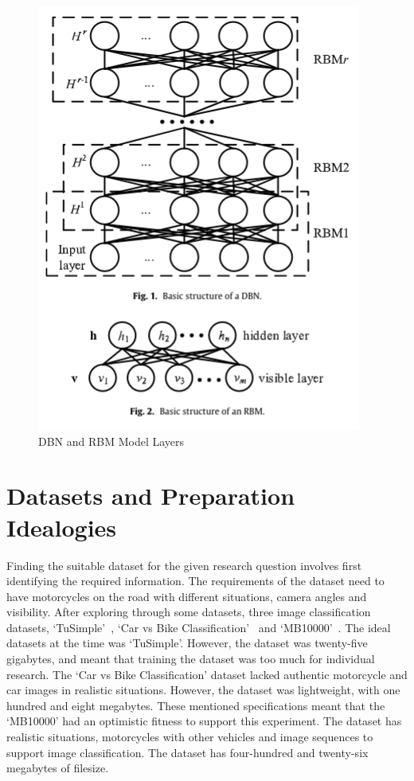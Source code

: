 \documentclass[12pt]{report} %
\begin{document}
		\begin{figure}[htp]
			\centering
			\includegraphics[width=\columnwidth]{Figures/literature_review/proposal/DBNRBMLayers.png}
			\caption{DBN and RBM Model Layers~\cite{zhao_parallel_2019}}
			\label{fig:dbnRBMLayers}
		\end{figure}

	\section{Datasets and Preparation Idealogies}
		Finding the suitable dataset for the given research question involves first identifying the required information. The requirements of the dataset need to have motorcycles on the road with different situations, camera angles and visibility. After exploring through some datasets, three image classification datasets, `TuSimple'~\cite{jeong_end--end_2017}, `Car vs Bike Classification'~\cite{deepnets_car_nodate} and `MB10000'~\cite{espinosa_motorcycle_2018}. The ideal datasets at the time was `TuSimple'. However, the dataset was twenty-five gigabytes, and meant that training the dataset was too much for individual research. The `Car vs Bike Classification' dataset lacked authentic motorcycle and car images in realistic situations. However, the dataset was lightweight, with one hundred and eight megabytes. These mentioned specifications meant that the `MB10000' had an optimistic fitness to support this experiment. The dataset has realistic situations, motorcycles with other vehicles and image sequences to support image classification. The dataset has four-hundred and twenty-six megabytes of filesize.
\end{document}
